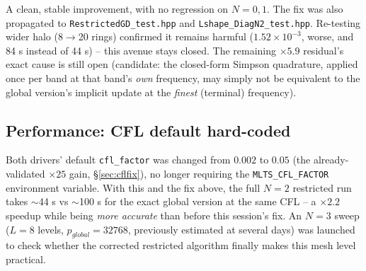\documentclass[11pt]{article}
\begin{document}
A clean, stable improvement, with no regression on $N=0,1$. The fix was
also propagated to \texttt{RestrictedGD\_test.hpp} and
\texttt{Lshape\_DiagN2\_test.hpp}. Re-testing wider halo (8$\to$20
rings) confirmed it remains harmful ($1.52\times10^{-3}$, worse, and
84 s instead of 44 s) -- this avenue stays closed. The remaining
$\times5.9$ residual's exact cause is still open (candidate: the
closed-form Simpson quadrature, applied once per band at that band's
\emph{own} frequency, may simply not be equivalent to the global
version's implicit update at the \emph{finest} (terminal) frequency).

\subsection{Performance: CFL default hard-coded}

Both drivers' default \texttt{cfl\_factor} was changed from $0.002$ to
$0.05$ (the already-validated $\times25$ gain, \S\ref{sec:cflfix}), no
longer requiring the \texttt{MLTS\_CFL\_FACTOR} environment variable.
With this and the fix above, the full $N=2$ restricted run takes
$\sim$44 s vs $\sim$100 s for the exact global version at the same
CFL -- a $\times2.2$ speedup while being \emph{more accurate} than
before this session's fix. An $N=3$ sweep ($L=8$ levels,
$p_{global}=32768$, previously estimated at several days) was launched
to check whether the corrected restricted algorithm finally makes this
mesh level practical.
\end{document}
